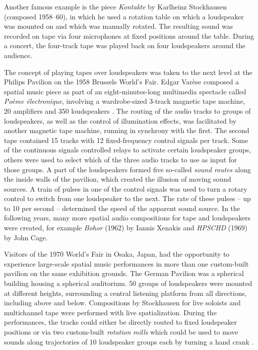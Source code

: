 Another famous example is
the piece \emph{Kontakte} by Karlheinz Stockhausen
(composed 1958--60),
in which he used a rotation table on which a loudspeaker was mounted on and
which was manually rotated.
The resulting sound was recorded on
tape via four microphones at fixed positions around the table.
During a concert, the four-track tape was played back on four loudspeakers
around the audience.

The concept of playing tapes over loudspeakers
was taken to the next level
at the Philips Pavilion on the 1958 Brussels World's Fair.
Edgar Varèse composed a spatial music piece as part of
an eight-minutes-long multimedia spectacle
called \emph{Poème électronique},
involving a wardrobe-sized 3-track magnetic tape machine,
20 amplifiers and 350 loudspeakers
\parencite{kalff1958poem}.
The routing of the audio tracks to groups of loudspeakers,
as well as the control of illumination effects,
was facilitated by another magnetic tape machine,
running in synchrony with the first.
The second tape contained 15 tracks
with 12 fixed-frequency control signals per track.
Some of the continuous signals controlled relays to activate
certain loudspeaker groups,
others were used to select which of the three audio tracks to use
as input for those groups.
A part of the loudspeakers formed five so-called \emph{sound routes}
along the inside walls of the pavilion,
which created the illusion of moving sound sources.
A train of pulses in one of the control signals
was used to turn a rotary control to switch from one loudspeaker to the next.
The rate of these pulses -- up to 10 per second --
determined the speed of the apparent sound source.
In the following years,
many more spatial audio compositions for tape and loudspeakers were created,
for example
\emph{Bohor} (1962) by Iannis Xenakis
and
\emph{HPSCHD} (1969) by John Cage.

Visitors of the 1970 World's Fair in Osaka, Japan,
had the opportunity to experience
large-scale spatial music performances
in more than one custom-built pavilion on the same exhibition grounds.
The German Pavilion was a spherical building housing a spherical auditorium.
50 groups of loudspeakers were mounted at different heights,
surrounding a central listening platform from all directions,
including above and below.
Compositions by Stockhausen for
live soloists and multichannel tape
were performed with live spatialization.
During the performances,
the tracks could either be directly routed to fixed loudspeaker positions
or via two custom-built
\emph{rotation mills}
which could be used to move sounds
along trajectories of 10 loudspeaker groups each
by turning a hand crank
\parencite{bates2015kontakte}.

